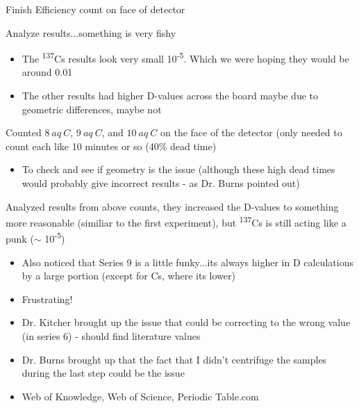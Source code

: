 \documentclass[idxtotoc,hyperref,openany,oneside]{labbook} %
\newcommand{\cmark}{\ding{51}}%
\newcommand{\done}{\rlap{$\square$}{\raisebox{2pt}{\large\hspace{1pt}\cmark}}%
  \hspace{-2.5pt}}
\newcommand{\tss}{\textsuperscript}
\begin{document}



\begin{todolist}
\item[\done]{Finish Efficiency count on face of detector}
\item[\done]{Analyze results...something is very fishy}
  \begin{itemize}
  \item{The \tss{137}Cs results look very small 10\tss{-5}.
    Which we were hoping they would be around 0.01}
  \item{The other results had higher D-values across the board
    maybe due to geometric differences, maybe not}
  \end{itemize}
\item[\done]{Counted $\boxed{8\ aq\ C}$, $\boxed{9\ aq\ C}$,
  and $\boxed{10\ aq\ C}$ on the face of the detector (only needed
  to count each like 10 minutes or so (40\% dead time)}
  \begin{itemize}
  \item{To check and see if geometry is the issue (although these
    high dead times would probably give incorrect results - as
    Dr. Burns pointed out)}
  \end{itemize}
\item[\done]{Analyzed results from above counts, they increased
  the D-values to something more reasonable (similiar to the first
  experiment), but \tss{137}Cs is still acting like a punk
  ($\sim$ 10\tss{-5})}
  \begin{itemize}
  \item{Also noticed that Series 9 is a little funky...its always
    higher in D calculations by a large portion (except for Cs,
    where its lower)}
  \item{Frustrating!}
  \item{Dr. Kitcher brought up the issue that could be correcting to
    the wrong value (in series 6) - should find literature values}
  \item{Dr. Burns brought up that the fact that I didn't centrifuge
    the samples during the last step could be the issue}
  \item{Web of Knowledge, Web of Science, Periodic Table.com}
  \end{itemize}

\end{todolist}
\end{document}
